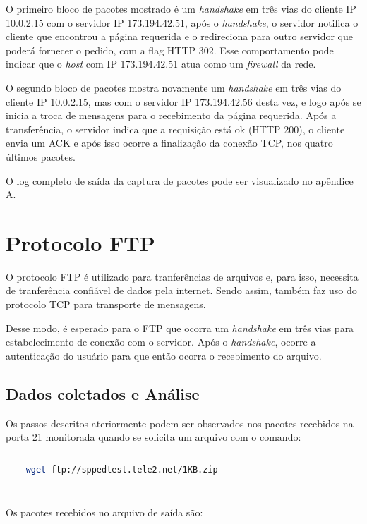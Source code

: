 \documentclass[a4paper]{report} %
\begin{document}
	O primeiro bloco de pacotes mostrado é um \textit{handshake} em três vias do cliente IP 10.0.2.15 com o servidor IP 173.194.42.51, após o \textit{handshake}, o servidor notifica o cliente que encontrou a página requerida e o redireciona para outro servidor que poderá fornecer o pedido, com a flag HTTP 302. Esse comportamento pode indicar que o \textit{host} com IP 173.194.42.51 atua como um \textit{firewall} da rede. 
	
	O segundo bloco de pacotes mostra novamente um \textit{handshake} em três vias do cliente IP 10.0.2.15, mas com o servidor IP 173.194.42.56 desta vez, e logo após se inicia a troca de mensagens para o recebimento da página requerida. Após a transferência, o servidor indica que a requisição está ok (HTTP 200), o cliente envia um ACK e após isso ocorre a finalização da conexão TCP, nos quatro últimos pacotes.

	O log completo de saída da captura de pacotes pode ser visualizado no apêndice A.

\section{Protocolo FTP}
\label{sec_ftp}
	
	O protocolo FTP é utilizado para tranferências de arquivos e, para isso, necessita de tranferência confiável de dados pela internet. Sendo assim, também faz uso do protocolo TCP para transporte de mensagens. 
	
	Desse modo, é esperado para o FTP que ocorra um \textit{handshake} em três vias para estabelecimento de conexão com o servidor. Após o \textit{handshake}, ocorre a autenticação do usuário para que então ocorra o recebimento do arquivo. 
	
\subsection{Dados coletados e Análise}
\label{sub_ftp_dados}
	Os passos descritos ateriormente podem ser observados nos pacotes recebidos na porta 21 monitorada quando se solicita um arquivo com o comando:
	
\begin{lstlisting}[language=bash]
	
	wget ftp://sppedtest.tele2.net/1KB.zip 
	
	
\end{lstlisting}
	
	Os pacotes recebidos no arquivo de saída são:
	
\end{document}
